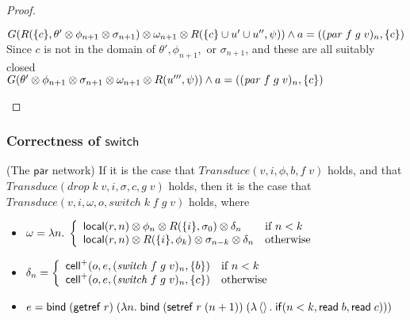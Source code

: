 \begin{proof}
\begin{tabbedproof}
\oo $G(R(\{{c}\}, \theta' \otimes \phi_{n+1} \otimes \sigma_{n+1}) \otimes \omega_{n+1} \otimes R(\{{c}\} \cup u' \cup u'', \psi)) \land a = ((\mathit{par}\;f\;g\;v)_n, \{{c}\})$ \\
\oo Since $c$ is not in the domain of $\theta', \phi_{n+1},$ or $\sigma_{n+1}$, and these are all suitably closed\\
\oo $G(\theta' \otimes \phi_{n+1} \otimes \sigma_{n+1} \otimes \omega_{n+1} \otimes R(u''', \psi)) \land a = ((\mathit{par}\;f\;g\;v)_n, \{{c}\})$ \\
\end{tabbedproof}
\end{proof}

\subsubsection{Correctness of $\mathsf{switch}$}

\begin{lemma}{(The $\mathsf{par}$ network)}
If it is the case that $\mathit{Transduce}(v, i, \phi, b,f\;v)$ holds, and that 
$\mathit{Transduce}(\mathit{drop}\;k\;v, i, \sigma, c, g\;v)$ holds,
then it is the case that $\mathit{Transduce}(v, i, \omega, o,
\mathit{switch}\;k\;f\;g\;v)$ holds, where

\begin{itemize}
\item $\omega = \lambda n.\;\left\{\begin{array}{ll}
                                    \mathsf{local}({r}, {n}) \otimes \phi_n \otimes R(\{{i}\}, \sigma_0) \otimes \delta_n 
                                    & \mbox{if } n < k \\
                                    \mathsf{local}({r}, {n}) \otimes R(\{{i}\}, \phi_k) \otimes \sigma_{n-k} \otimes \delta_n 
                                    & \mbox{otherwise} \\
                                   \end{array}\right.$
\item $\delta_n = \left\{\begin{array}{ll}
                          \mathsf{cell}^{+}({o}, {e}, {(\mathit{switch}\;f\;g\;v)_n}, {\{{b}\}}) & \mbox{if } n < k\\
                          \mathsf{cell}^{+}({o}, {e}, {(\mathit{switch}\;f\;g\;v)_n}, {\{{c}\}}) & \mbox{otherwise} \\
                         \end{array}
                 \right.$
\item $e = \mathsf{bind}\; (\mathsf{getref}\; r)\; (\lambda n.\;\mathsf{bind}\; (\mathsf{setref}\; r\;(n+1))\; (\lambda \left<\right>.\;\mathsf{if}({n < k}, {\mathsf{read}\; b}, {\mathsf{read}\; c})))$
           

\end{itemize}
\end{lemma}

